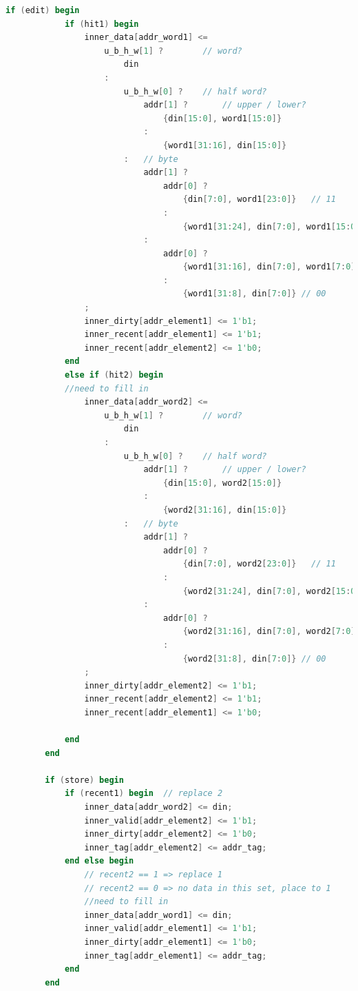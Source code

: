 \begin{lstlisting}[language = {verilog}]
        if (edit) begin
            if (hit1) begin
                inner_data[addr_word1] <= 
                    u_b_h_w[1] ?        // word?
                        din
                    :
                        u_b_h_w[0] ?    // half word?
                            addr[1] ?       // upper / lower?
                                {din[15:0], word1[15:0]} 
                            :
                                {word1[31:16], din[15:0]} 
                        :   // byte
                            addr[1] ?
                                addr[0] ?
                                    {din[7:0], word1[23:0]}   // 11
                                :
                                    {word1[31:24], din[7:0], word1[15:0]} // 10
                            :
                                addr[0] ?
                                    {word1[31:16], din[7:0], word1[7:0]}   // 01
                                :
                                    {word1[31:8], din[7:0]} // 00
                ;
                inner_dirty[addr_element1] <= 1'b1;
                inner_recent[addr_element1] <= 1'b1;
                inner_recent[addr_element2] <= 1'b0;
            end
            else if (hit2) begin
            //need to fill in
                inner_data[addr_word2] <= 
                    u_b_h_w[1] ?        // word?
                        din
                    :
                        u_b_h_w[0] ?    // half word?
                            addr[1] ?       // upper / lower?
                                {din[15:0], word2[15:0]} 
                            :
                                {word2[31:16], din[15:0]} 
                        :   // byte
                            addr[1] ?
                                addr[0] ?
                                    {din[7:0], word2[23:0]}   // 11
                                :
                                    {word2[31:24], din[7:0], word2[15:0]} // 10
                            :
                                addr[0] ?
                                    {word2[31:16], din[7:0], word2[7:0]}   // 01
                                :
                                    {word2[31:8], din[7:0]} // 00
                ;
                inner_dirty[addr_element2] <= 1'b1;
                inner_recent[addr_element2] <= 1'b1;
                inner_recent[addr_element1] <= 1'b0;
                    
            end
        end

        if (store) begin
            if (recent1) begin  // replace 2
                inner_data[addr_word2] <= din;
                inner_valid[addr_element2] <= 1'b1;
                inner_dirty[addr_element2] <= 1'b0;
                inner_tag[addr_element2] <= addr_tag;
            end else begin
                // recent2 == 1 => replace 1
                // recent2 == 0 => no data in this set, place to 1
                //need to fill in
                inner_data[addr_word1] <= din;
                inner_valid[addr_element1] <= 1'b1;
                inner_dirty[addr_element1] <= 1'b0;
                inner_tag[addr_element1] <= addr_tag;
            end
        end


\end{lstlisting}
